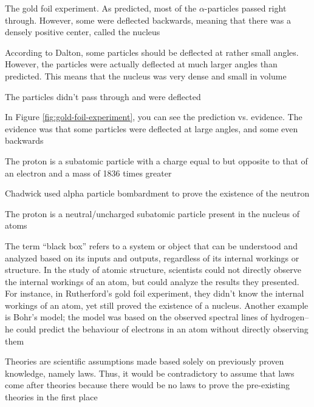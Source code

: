 \begin{solutions}
    \item The gold foil experiment. As predicted, most of the $\alpha$-particles passed right through.
        However, some were deflected backwards, meaning that there was a densely positive center,
        called the nucleus
    \item 
        \begin{enum-alph}
            \item According to Dalton, some particles should be deflected at rather small angles.
                However, the particles were actually deflected at much larger angles than
                predicted. This means that the nucleus was very dense and small in volume
            \item The particles didn't pass through and were deflected
        \end{enum-alph}
    \item 
        \begin{enum-alph}
            \item In Figure \ref{fig:gold-foil-experiment}, you can see the prediction vs. evidence.
                The evidence was that some particles were deflected at large angles, and some
                even backwards
            \item The proton is a subatomic particle with a charge equal to but opposite to
                that of an electron and a mass of 1836 times greater
        \end{enum-alph}
    \item
        \begin{enum-alph}
            \item Chadwick used alpha particle bombardment to prove the existence of the neutron
            \item The proton is a neutral/uncharged subatomic particle present in the nucleus
                of atoms
        \end{enum-alph}
    \item The term ``black box'' refers to a system or object that can be understood and analyzed
        based on its inputs and outputs, regardless of its internal workings or structure.
        In the study of atomic structure, scientists could not directly observe the internal
        workings of an atom, but could analyze the results they presented. For instance, in
        Rutherford's gold foil experiment, they didn't know the internal workings of an atom,
        yet still proved the existence of a nucleus. Another example is Bohr's model; the model
        was based on the observed spectral lines of hydrogen--he could predict the behaviour of
        electrons in an atom without directly observing them
    \item Theories are scientific assumptions made based solely on previously proven knowledge,
        namely laws. Thus, it would be contradictory to assume that laws come after theories
        because there would be no laws to prove the pre-existing theories in the first place
\end{solutions}

